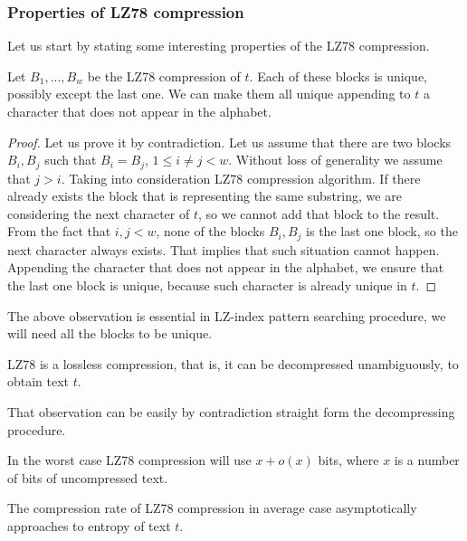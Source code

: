\subsubsection{Properties of LZ78 compression}

Let us start by stating some interesting properties of the LZ78 compression.

\begin{observation} \cite{LZIndex} 
    Let $B_1,...,B_w$ be the LZ78 compression of $t$. Each of these blocks is unique, possibly except the last one. We can make them all unique appending to $t$ a character that does not appear in the alphabet.
\end{observation}

\begin{proof}
    Let us prove it by contradiction. Let us assume that there are two blocks $B_i, B_j$ such that $B_i = B_j$, $1 \leq i \neq j < w$. Without loss of generality we assume that $j > i$. Taking into consideration LZ78 compression algorithm. If there already exists the block that is representing the same substring, we are considering the next character of $t$, so we cannot add that block to the result. From the fact that $i, j < w$, none of the blocks $B_i, B_j$ is the last one block, so the next character always exists. That implies that such situation cannot happen. Appending the character that does not appear in the alphabet, we ensure that the last one block is unique, because such character is already unique in $t$.
\end{proof}

The above observation is essential in LZ-index pattern searching procedure, we will need all the blocks to be unique. 

\begin{observation} \cite{LZ78} 
    LZ78 is a lossless compression, that is, it can be decompressed unambiguously, to obtain text $t$.
\end{observation}

That observation can be easily by contradiction straight form the decompressing procedure.

\begin{observation} \cite{entropyProof}
    In the worst case LZ78 compression will use $x + o(x)$ bits, where $x$ is a number of bits of uncompressed text.
\end{observation}

\begin{observation} \cite{entropyProof} 
    The compression rate of LZ78 compression in average case asymptotically approaches to entropy of text $t$.
\end{observation}

